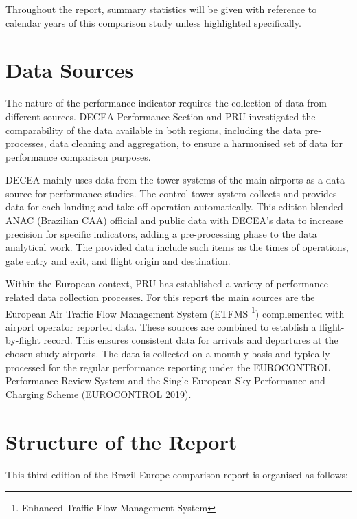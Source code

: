 \documentclass[
  a4paper,
  DIV=11,
  numbers=noendperiod]{scrreport}
\begin{document}
Throughout the report, summary statistics will be given with reference
to calendar years of this comparison study unless highlighted
specifically.

\section{Data Sources}\label{data-sources}

The nature of the performance indicator requires the collection of data
from different sources. DECEA Performance Section and PRU investigated
the comparability of the data available in both regions, including the
data pre-processes, data cleaning and aggregation, to ensure a
harmonised set of data for performance comparison purposes.

DECEA mainly uses data from the tower systems of the main airports as a
data source for performance studies. The control tower system collects
and provides data for each landing and take-off operation automatically.
This edition blended ANAC (Brazilian CAA) official and public data with
DECEA's data to increase precision for specific indicators, adding a
pre-processing phase to the data analytical work. The provided data
include such items as the times of operations, gate entry and exit, and
flight origin and destination.

Within the European context, PRU has established a variety of
performance-related data collection processes. For this report the main
sources are the European Air Traffic Flow Management System (ETFMS
\footnote{Enhanced Traffic Flow Management System}) complemented with
airport operator reported data. These sources are combined to establish
a flight-by-flight record. This ensures consistent data for arrivals and
departures at the chosen study airports. The data is collected on a
monthly basis and typically processed for the regular performance
reporting under the EUROCONTROL Performance Review System and the Single
European Sky Performance and Charging Scheme (EUROCONTROL 2019).

\section{Structure of the Report}\label{structure-of-the-report}

This third edition of the Brazil-Europe comparison report is organised
as follows:
\end{document}
